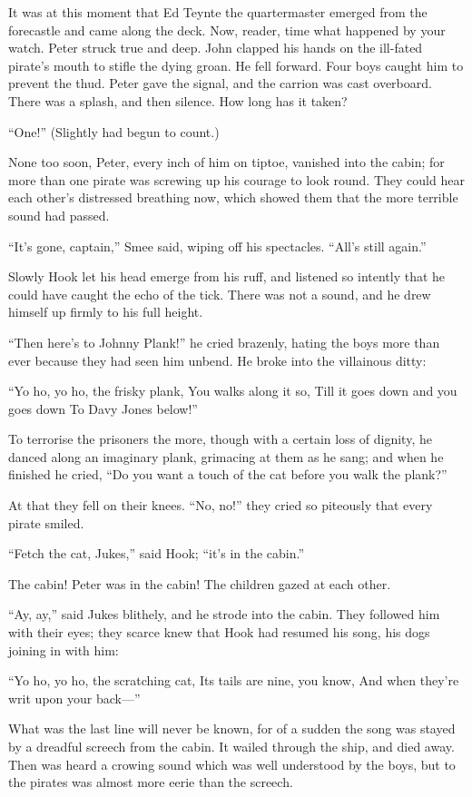 It was at this moment that Ed Teynte the quartermaster emerged from the
forecastle and came along the deck. Now, reader, time what happened by
your watch. Peter struck true and deep. John clapped his hands on the
ill-fated pirate's mouth to stifle the dying groan. He fell forward.
Four boys caught him to prevent the thud. Peter gave the signal, and
the carrion was cast overboard. There was a splash, and then silence.
How long has it taken?

``One!'' (Slightly had begun to count.)

None too soon, Peter, every inch of him on tiptoe, vanished into the
cabin; for more than one pirate was screwing up his courage to look
round. They could hear each other's distressed breathing now, which
showed them that the more terrible sound had passed.

``It's gone, captain,'' Smee said, wiping off his spectacles. ``All's
still again.''

Slowly Hook let his head emerge from his ruff, and listened so intently
that he could have caught the echo of the tick. There was not a sound,
and he drew himself up firmly to his full height.

``Then here's to Johnny Plank!'' he cried brazenly, hating the boys more
than ever because they had seen him unbend. He broke into the
villainous ditty:

``Yo ho, yo ho, the frisky plank,
    You walks along it so,
Till it goes down and you goes down
    To Davy Jones below!''

To terrorise the prisoners the more, though with a certain loss of
dignity, he danced along an imaginary plank, grimacing at them as he
sang; and when he finished he cried, ``Do you want a touch of the cat
before you walk the plank?''

At that they fell on their knees. ``No, no!'' they cried so piteously
that every pirate smiled.

``Fetch the cat, Jukes,'' said Hook; ``it's in the cabin.''

The cabin! Peter was in the cabin! The children gazed at each other.

``Ay, ay,'' said Jukes blithely, and he strode into the cabin. They
followed him with their eyes; they scarce knew that Hook had resumed
his song, his dogs joining in with him:

``Yo ho, yo ho, the scratching cat,
    Its tails are nine, you know,
And when they're writ upon your back—''

What was the last line will never be known, for of a sudden the song
was stayed by a dreadful screech from the cabin. It wailed through the
ship, and died away. Then was heard a crowing sound which was well
understood by the boys, but to the pirates was almost more eerie than
the screech.

